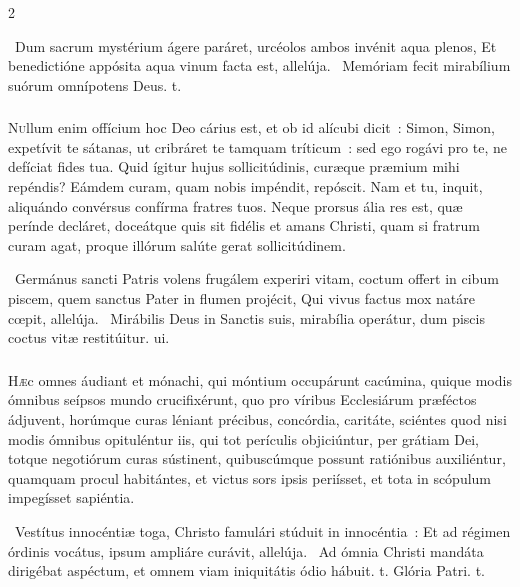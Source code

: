 \documentclass[9pt,twoside]{extarticle}
\begin{document}
\begin{multicols}{2}
{\begin{tightlist}{}
\item {}~Dum sacrum mystérium ágere paráret, urcéolos ambos invénit aqua plenos, \textred{*} Et benedictióne appósita aqua vinum facta est, allelúja. ~Memóriam fecit mirabílium suórum omnípotens Deus. t.
\end{tightlist}

\subsubsection*{\center {}}
\lettrine{N}ullum enim offícium hoc Deo cárius est, et ob id alícubi dicit~: Simon, Simon, expetívit te sátanas, ut cribráret te tamquam tríticum~: sed ego rogávi pro te, ne defíciat fides tua. Quid ígitur hujus sollicitúdinis, curæque præmium mihi repéndis? Eámdem curam, quam nobis impéndit, repóscit. Nam et tu, inquit, aliquándo convérsus confírma fratres tuos. Neque prorsus ália res est, quæ perínde decláret, doceátque quis sit fidélis et amans Christi, quam si fratrum curam agat, proque illórum salúte gerat sollicitúdinem.

\begin{tightlist}{}
\item {}~Germánus sancti Patris volens frugálem experiri vitam, coctum offert in cibum piscem, quem sanctus Pater in flumen projécit, \textred{*} Qui vivus factus mox natáre cœpit, allelúja. ~Mirábilis Deus in Sanctis suis, mirabília operátur, dum piscis coctus vitæ restitúitur. ui.
\end{tightlist}

\subsubsection*{\center {}}
\lettrine{H}æc omnes áudiant et mónachi, qui móntium occupárunt cacúmina, quique modis ómnibus seípsos mundo crucifixérunt, quo pro víribus Ecclesiárum præféctos ádjuvent, horúmque curas léniant précibus, concórdia, caritáte, sciéntes quod nisi modis ómnibus opituléntur iis, qui tot perículis objiciúntur, per grátiam Dei, totque negotiórum curas sústinent, quibuscúmque possunt ratiónibus auxiliéntur, quamquam procul habitántes, et victus sors ipsis periísset, et tota in scópulum impegísset sapiéntia.

\begin{tightlist}{}
\item {}~Vestítus innocéntiæ toga, Christo famulári stúduit in innocéntia~: \textred{*} Et ad régimen órdinis vocátus, ipsum ampliáre curávit, allelúja. ~Ad ómnia Christi mandáta dirigébat aspéctum, et omnem viam iniquitátis ódio hábuit. t. Glória Patri. t.
\end{tightlist}

}
\end{multicols}
\end{document}
